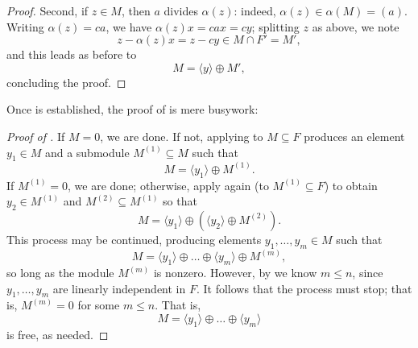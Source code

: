 \begin{proof}
  Second, if $z \in M$, then $a$ divides $\alpha(z)$: indeed,
  $\alpha(z) \in \alpha(M) = (a)$. Writing $\alpha(z) = ca$, we have
  $\alpha(z)x = cax = cy$; splitting $z$ as above, we note
  \[
    z - \alpha(z)x = z - cy \in M \cap F' = M',
  \]
  and this leads as before to
  \[
    M = \langle y \rangle \oplus M',
  \]
  concluding the proof.
\end{proof}

Once  is established, the proof of 
is mere busywork:
\begin{proof}[Proof of ]
  If $M = 0$, we are done. If not, applying  to
  $M \subseteq F$ produces an element $y_1 \in M$ and a submodule
  $M^{(1)} \subseteq M$ such that
  \[
    M = \langle y_1 \rangle \oplus M^{(1)}.
  \]
  If $M^{(1)} = 0$, we are done; otherwise, apply 
  again (to $M^{(1)} \subseteq F$) to obtain $y_2 \in M^{(1)}$ and
  $M^{(2)} \subseteq M^{(1)}$ so that
  \[
    M = \langle y_1 \rangle \oplus (\langle y_2 \rangle \oplus
    M^{(2)}).
  \]
  This process may be continued, producing elements
  $y_1, \dots, y_m \in M$ such that
  \[
    M = \langle y_1 \rangle \oplus \dots \oplus \langle y_m \rangle
    \oplus M^{(m)},
  \]
  so long as the module $M^{(m)}$ is nonzero. However, by
   we know $m \leq n$, since $y_1, \dots, y_m$ are
  linearly independent in $F$. It follows that the process must stop;
  that is, $M^{(m)} = 0$ for some $m \leq n$. That is,
  \[
    M = \langle y_1 \rangle \oplus \dots \oplus \langle y_m \rangle
  \]
  is free, as needed.
\end{proof}

